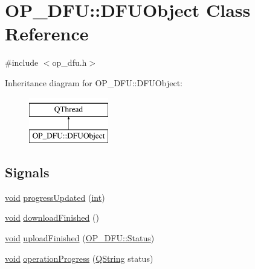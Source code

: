 \hypertarget{class_o_p___d_f_u_1_1_d_f_u_object}{\section{O\-P\-\_\-\-D\-F\-U\-:\-:D\-F\-U\-Object Class Reference}
\label{class_o_p___d_f_u_1_1_d_f_u_object}
}


{\ttfamily \#include $<$op\-\_\-dfu.\-h$>$}

Inheritance diagram for O\-P\-\_\-\-D\-F\-U\-:\-:D\-F\-U\-Object\-:\begin{figure}[H]
\begin{center}
\leavevmode
\includegraphics[height=2.000000cm]{class_o_p___d_f_u_1_1_d_f_u_object}
\end{center}
\end{figure}
\subsection*{Signals}
\begin{DoxyCompactItemize}
\item 
\hyperlink{group___u_a_v_objects_plugin_ga444cf2ff3f0ecbe028adce838d373f5c}{void} \hyperlink{class_o_p___d_f_u_1_1_d_f_u_object_a1747e4980c4dd7c5f7aa6a5bc8d062d6}{progress\-Updated} (\hyperlink{ioapi_8h_a787fa3cf048117ba7123753c1e74fcd6}{int})
\item 
\hyperlink{group___u_a_v_objects_plugin_ga444cf2ff3f0ecbe028adce838d373f5c}{void} \hyperlink{class_o_p___d_f_u_1_1_d_f_u_object_aa992a6776ef6e88ef4be90c9edc6c647}{download\-Finished} ()
\item 
\hyperlink{group___u_a_v_objects_plugin_ga444cf2ff3f0ecbe028adce838d373f5c}{void} \hyperlink{class_o_p___d_f_u_1_1_d_f_u_object_a40da1291da633fd5b0135d67b55f34c1}{upload\-Finished} (\hyperlink{class_o_p___d_f_u_a83b075feaf572fe76e597acea58c8eda}{O\-P\-\_\-\-D\-F\-U\-::\-Status})
\item 
\hyperlink{group___u_a_v_objects_plugin_ga444cf2ff3f0ecbe028adce838d373f5c}{void} \hyperlink{class_o_p___d_f_u_1_1_d_f_u_object_a8867ea1fd25b22c6189b4e60e3d1c3d5}{operation\-Progress} (\hyperlink{group___u_a_v_objects_plugin_gab9d252f49c333c94a72f97ce3105a32d}{Q\-String} status)
\end{DoxyCompactItemize}
